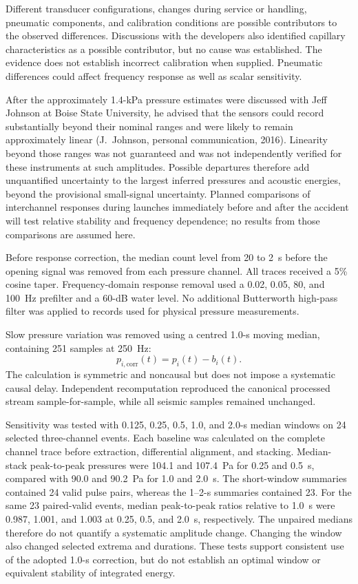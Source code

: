 \documentclass[]{seismica}
\begin{document}
Different transducer configurations, changes during service or handling,
pneumatic components, and calibration conditions are possible contributors
to the observed differences. Discussions with the developers also identified
capillary characteristics as a possible contributor, but no cause was
established. The evidence does not establish incorrect calibration when
supplied. Pneumatic differences could affect frequency response as well as
scalar sensitivity.

After the approximately 1.4-kPa pressure estimates were discussed with Jeff
Johnson at Boise State University, he advised that the sensors could record
substantially beyond their nominal ranges and were likely to remain
approximately linear (J.~Johnson, personal communication, 2016). Linearity
beyond those ranges was not guaranteed and was not independently verified
for these instruments at such amplitudes. Possible departures therefore add
unquantified uncertainty to the largest inferred pressures and acoustic
energies, beyond the provisional small-signal uncertainty. Planned comparisons
of interchannel responses during launches immediately before and after the
accident will test relative stability and frequency dependence; no results
from those comparisons are assumed here.

Before response correction, the median count level from 20 to 2~s before the
opening signal was removed from each pressure channel. All traces received a
5\% cosine taper. Frequency-domain response removal used a 0.02, 0.05, 80, and
100~Hz prefilter and a 60-dB water level. No additional Butterworth high-pass
filter was applied to records used for physical pressure measurements.

Slow pressure variation was removed using a centred 1.0-s moving median,
containing 251 samples at 250~Hz:
\begin{equation}
 p_{i,\mathrm{corr}}(t)=p_i(t)-b_i(t).
\end{equation}
The calculation is symmetric and noncausal but does not impose a systematic
causal delay. Independent recomputation reproduced the canonical processed
stream sample-for-sample, while all seismic samples remained unchanged.

Sensitivity was tested with 0.125, 0.25, 0.5, 1.0, and 2.0-s median windows on
24 selected three-channel events. Each baseline was calculated on the complete
channel trace before extraction, differential alignment, and stacking.
Median-stack peak-to-peak pressures were 104.1 and 107.4~Pa for 0.25 and
0.5~s, compared with 90.0 and 90.2~Pa for 1.0 and 2.0~s. The short-window
summaries contained 24 valid pulse pairs, whereas the 1--2-s summaries contained
23. For the same 23 paired-valid events, median peak-to-peak ratios relative
to 1.0~s were 0.987, 1.001, and 1.003 at 0.25, 0.5, and 2.0~s, respectively.
The unpaired medians therefore do not quantify a systematic amplitude change.
Changing the window
also changed selected extrema and durations. These tests support consistent
use of the adopted 1.0-s correction, but do not establish an optimal window
or equivalent stability of integrated energy.
\end{document}

